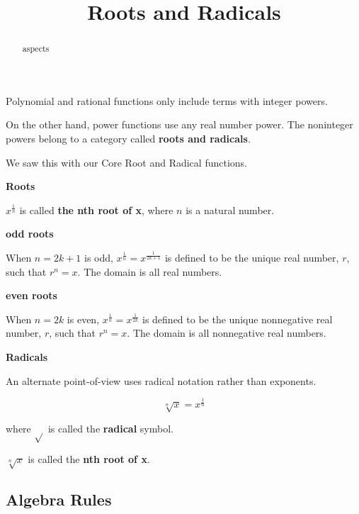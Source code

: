 \documentclass{ximera}
\title{Roots and Radicals}
\begin{document}
\begin{abstract}
aspects
\end{abstract}
\maketitle





Polynomial and rational functions only include terms with integer powers. 


On the other hand, power functions use any real number power.  The noninteger powers belong to a category called \textbf{roots and radicals}.

We saw this with our Core Root and Radical functions.



\begin{definition} \textbf{\textcolor{green!50!black}{Roots}}

$x^{\tfrac{1}{n}}$ is called \textbf{the nth root of x}, where $n$ is a natural number.




\textbf{odd roots}

When $n = 2k+1$ is odd, $x^{\tfrac{1}{n}} = x^{\tfrac{1}{2k+1}}$ is defined to be the unique real number, $r$, such that $r^n = x$. The domain is all real numbers.




\textbf{even roots}

When $n=2k$ is even, $x^{\tfrac{1}{n}} = x^{\tfrac{1}{2k}}$ is defined to be the unique nonnegative real number, $r$, such that $r^n = x$. The domain is all nonnegative real numbers.


\end{definition}



\begin{definition} \textbf{\textcolor{green!50!black}{Radicals}}

An alternate point-of-view uses radical notation rather than exponents.

\[   \sqrt[n]{x} =  x^{\tfrac{1}{n}}     \]

where $\sqrt{ }$ is called the \textbf{radical} symbol.


$\sqrt[n]{x}$ is called the \textbf{nth root of x}.

\end{definition}




\subsection*{Algebra Rules}
\end{document}
